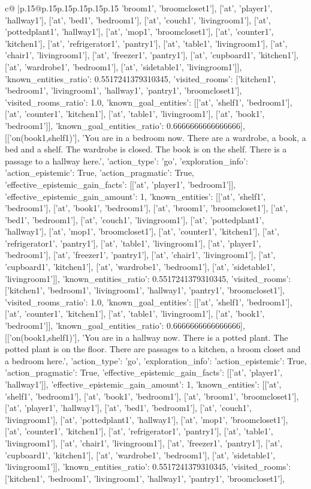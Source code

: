 \documentclass{article}
\begin{document}
{\begin{supertabular}{c@{$\;$}|p{.15\linewidth}@{}p{.15\linewidth}p{.15\linewidth}p{.15\linewidth}p{.15\linewidth}p{.15\linewidth}}
{{{'broom1', 'broomcloset1'], ['at', 'player1', 'hallway1'], ['at', 'bed1', 'bedroom1'], ['at', 'couch1', 'livingroom1'], ['at', 'pottedplant1', 'hallway1'], ['at', 'mop1', 'broomcloset1'], ['at', 'counter1', 'kitchen1'], ['at', 'refrigerator1', 'pantry1'], ['at', 'table1', 'livingroom1'], ['at', 'chair1', 'livingroom1'], ['at', 'freezer1', 'pantry1'], ['at', 'cupboard1', 'kitchen1'], ['at', 'wardrobe1', 'bedroom1'], ['at', 'sidetable1', 'livingroom1']], 'known_entities_ratio': 0.5517241379310345, 'visited_rooms': ['kitchen1', 'bedroom1', 'livingroom1', 'hallway1', 'pantry1', 'broomcloset1'], 'visited_rooms_ratio': 1.0, 'known_goal_entities': [['at', 'shelf1', 'bedroom1'], ['at', 'counter1', 'kitchen1'], ['at', 'table1', 'livingroom1'], ['at', 'book1', 'bedroom1']], 'known_goal_entities_ratio': 0.6666666666666666}}], [['on(book1,shelf1)'], 'You are in a bedroom now. There are a wardrobe, a book, a bed and a shelf. The wardrobe is closed. The book is on the shelf. There is a passage to a hallway here.', {'action_type': 'go', 'exploration_info': {'action_epistemic': True, 'action_pragmatic': True, 'effective_epistemic_gain_facts': [['at', 'player1', 'bedroom1']], 'effective_epistemic_gain_amount': 1, 'known_entities': [['at', 'shelf1', 'bedroom1'], ['at', 'book1', 'bedroom1'], ['at', 'broom1', 'broomcloset1'], ['at', 'bed1', 'bedroom1'], ['at', 'couch1', 'livingroom1'], ['at', 'pottedplant1', 'hallway1'], ['at', 'mop1', 'broomcloset1'], ['at', 'counter1', 'kitchen1'], ['at', 'refrigerator1', 'pantry1'], ['at', 'table1', 'livingroom1'], ['at', 'player1', 'bedroom1'], ['at', 'freezer1', 'pantry1'], ['at', 'chair1', 'livingroom1'], ['at', 'cupboard1', 'kitchen1'], ['at', 'wardrobe1', 'bedroom1'], ['at', 'sidetable1', 'livingroom1']], 'known_entities_ratio': 0.5517241379310345, 'visited_rooms': ['kitchen1', 'bedroom1', 'livingroom1', 'hallway1', 'pantry1', 'broomcloset1'], 'visited_rooms_ratio': 1.0, 'known_goal_entities': [['at', 'shelf1', 'bedroom1'], ['at', 'counter1', 'kitchen1'], ['at', 'table1', 'livingroom1'], ['at', 'book1', 'bedroom1']], 'known_goal_entities_ratio': 0.6666666666666666}}], [['on(book1,shelf1)'], 'You are in a hallway now. There is a potted plant. The potted plant is on the floor. There are passages to a kitchen, a broom closet and a bedroom here.', {'action_type': 'go', 'exploration_info': {'action_epistemic': True, 'action_pragmatic': True, 'effective_epistemic_gain_facts': [['at', 'player1', 'hallway1']], 'effective_epistemic_gain_amount': 1, 'known_entities': [['at', 'shelf1', 'bedroom1'], ['at', 'book1', 'bedroom1'], ['at', 'broom1', 'broomcloset1'], ['at', 'player1', 'hallway1'], ['at', 'bed1', 'bedroom1'], ['at', 'couch1', 'livingroom1'], ['at', 'pottedplant1', 'hallway1'], ['at', 'mop1', 'broomcloset1'], ['at', 'counter1', 'kitchen1'], ['at', 'refrigerator1', 'pantry1'], ['at', 'table1', 'livingroom1'], ['at', 'chair1', 'livingroom1'], ['at', 'freezer1', 'pantry1'], ['at', 'cupboard1', 'kitchen1'], ['at', 'wardrobe1', 'bedroom1'], ['at', 'sidetable1', 'livingroom1']], 'known_entities_ratio': 0.5517241379310345, 'visited_rooms': ['kitchen1', 'bedroom1', 'livingroom1', 'hallway1', 'pantry1', 'broomcloset1'], }}}
\end{supertabular}}
\end{document}
